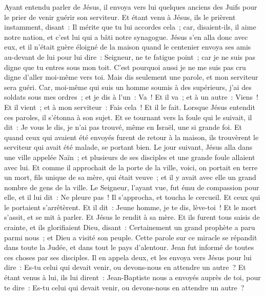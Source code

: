 \begin{multicols}{2}
Ayant entendu parler de Jésus, il envoya vers lui quelques anciens des Juifs pour le prier de venir guérir son serviteur.
Et étant venu à Jésus, ils le prièrent instamment, disant~: Il mérite que tu lui accordes cela~;
car, disaient-ils, il aime notre nation, et c'est lui qui a bâti notre synagogue.
Jésus s'en alla donc avec eux, et il n'était guère éloigné de la maison quand le centenier envoya ses amis au-devant de lui pour lui dire~: Seigneur, ne te fatigue point~; car je ne suis pas digne que tu entres sous mon toit.
C'est pourquoi aussi je ne me suis pas cru digne d'aller moi-même vers toi. Mais dis seulement une parole, et mon serviteur sera guéri.
Car, moi-même qui suis un homme soumis à des supérieurs, j'ai des soldats sous mes ordres~; et je dis à l'un~: Va~! Et il va~; et à un autre~: Viens~! Et il vient~; et à mon serviteur~: Fais cela~! Et il le fait.
Lorsque Jésus entendit ces paroles, il s'étonna à son sujet. Et se tournant vers la foule qui le suivait, il dit~: Je vous le dis, je n'ai pas trouvé, même en Israël, une si grande foi.
Et quand ceux qui avaient été envoyés furent de retour à la maison, ils trouvèrent le serviteur qui avait été malade, se portant bien.
Le jour suivant, Jésus alla dans une ville appelée Naïn~; et plusieurs de ses disciples et une grande foule allaient avec lui.
Et comme il approchait de la porte de la ville, voici, on portait en terre un mort, fils unique de sa mère, qui était veuve~; et il y avait avec elle un grand nombre de gens de la ville.
Le Seigneur, l'ayant vue, fut ému de compassion pour elle, et il lui dit~: Ne pleure pas~!
Il s'approcha, et toucha le cercueil. Et ceux qui le portaient s'arrêtèrent. Et il dit~: Jeune homme, je te dis, lève-toi~!
Et le mort s'assit, et se mit à parler. Et Jésus le rendit à sa mère.
Et ils furent tous saisis de crainte, et ils glorifiaient Dieu, disant~: Certainement un grand prophète a paru parmi nous~; et Dieu a visité son peuple.
Cette parole sur ce miracle se répandit dans toute la Judée, et dans tout le pays d'alentour.
Jean fut informé de toutes ces choses par ses disciples.
Il en appela deux, et les envoya vers Jésus pour lui dire~: Es-tu celui qui devait venir, ou devons-nous en attendre un autre~?
Et étant venus à lui, ils lui dirent~: Jean-Baptiste nous a envoyés auprès de toi, pour te dire~: Es-tu celui qui devait venir, ou devons-nous en attendre un autre~?

\end{multicols}
